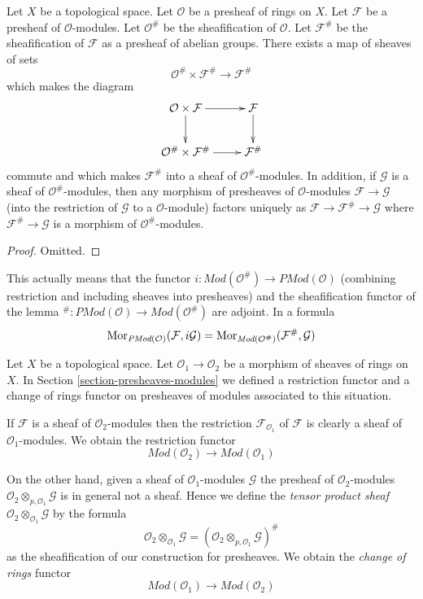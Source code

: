 \begin{lemma}
\label{lemma-sheafification-presheaf-modules}
Let $X$ be a topological space.
Let $\mathcal{O}$ be a presheaf of rings on $X$.
Let $\mathcal{F}$ be a presheaf of $\mathcal{O}$-modules.
Let $\mathcal{O}^\#$ be the sheafification of $\mathcal{O}$.
Let $\mathcal{F}^\#$ be the sheafification of $\mathcal{F}$
as a presheaf of abelian groups. There exists a map of
sheaves of sets
$$
\mathcal{O}^\# \times \mathcal{F}^\#
\longrightarrow
\mathcal{F}^\#
$$
which makes the diagram
$$
\xymatrix{
\mathcal{O} \times \mathcal{F} \ar[r] \ar[d] &
\mathcal{F} \ar[d] \\
\mathcal{O}^\# \times \mathcal{F}^\# \ar[r] &
\mathcal{F}^\#
}
$$
commute and which makes $\mathcal{F}^\#$ into a sheaf
of $\mathcal{O}^\#$-modules. In addition, if $\mathcal{G}$
is a sheaf of $\mathcal{O}^\#$-modules, then any morphism
of presheaves of $\mathcal{O}$-modules $\mathcal{F} \to \mathcal{G}$
(into the restriction of $\mathcal{G}$ to a $\mathcal{O}$-module)
factors uniquely as $\mathcal{F} \to \mathcal{F}^\# \to \mathcal{G}$
where $\mathcal{F}^\# \to \mathcal{G}$ is a morphism of
$\mathcal{O}^\#$-modules.
\end{lemma}

\begin{proof}
Omitted.
\end{proof}

\noindent
This actually means that the functor
$i : \textit{Mod}(\mathcal{O}^\#) \to \textit{PMod}(\mathcal{O})$
(combining restriction and including sheaves into presheaves)
and the sheafification functor of the lemma
${}^\# : \textit{PMod}(\mathcal{O}) \to \textit{Mod}(\mathcal{O}^\#)$
are adjoint. In a formula
$$
\mathop{\mathrm{Mor}}\nolimits_{\textit{PMod}(\mathcal{O})}(\mathcal{F}, i\mathcal{G})
=
\mathop{\mathrm{Mor}}\nolimits_{\textit{Mod}(\mathcal{O}^\#)}(\mathcal{F}^\#, \mathcal{G})
$$

\medskip\noindent
Let $X$ be a topological space.
Let $\mathcal{O}_1 \to \mathcal{O}_2$ be
a morphism of sheaves of rings on $X$.
In Section \ref{section-presheaves-modules}
we defined a restriction functor
and a change of rings functor on presheaves of modules
associated to this situation.

\medskip\noindent
If $\mathcal{F}$ is a sheaf of $\mathcal{O}_2$-modules
then the restriction $\mathcal{F}_{\mathcal{O}_1}$
of $\mathcal{F}$ is clearly a sheaf
of $\mathcal{O}_1$-modules. We obtain the restriction functor
$$
\textit{Mod}(\mathcal{O}_2)
\longrightarrow
\textit{Mod}(\mathcal{O}_1)
$$

\medskip\noindent
On the other hand, given a sheaf of $\mathcal{O}_1$-modules
$\mathcal{G}$ the presheaf of $\mathcal{O}_2$-modules
$\mathcal{O}_2 \otimes_{p, \mathcal{O}_1} \mathcal{G}$
is in general not a sheaf. Hence we define the
{\it tensor product sheaf}
$\mathcal{O}_2 \otimes_{\mathcal{O}_1} \mathcal{G}$
by the formula
$$
\mathcal{O}_2 \otimes_{\mathcal{O}_1} \mathcal{G}
=
(\mathcal{O}_2 \otimes_{p, \mathcal{O}_1} \mathcal{G})^\#
$$
as the sheafification of our construction for presheaves.
We obtain the {\it change of rings} functor
$$
\textit{Mod}(\mathcal{O}_1)
\longrightarrow
\textit{Mod}(\mathcal{O}_2)
$$

